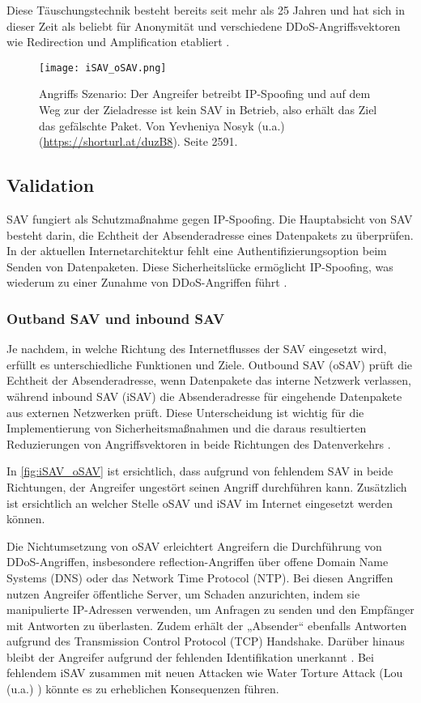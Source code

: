 \documentclass[sigplan,screen]{acmart}
\begin{document}
Diese Täuschungstechnik besteht bereits seit mehr als 25 Jahren und hat sich in dieser Zeit als beliebt für Anonymität und verschiedene DDoS-Angriffsvektoren wie Redirection und Amplification etabliert \cite{manrs01}.

\begin{figure}[h]
  \centering
  \texttt{[image: iSAV\_oSAV.png]}
  \caption{Angriffs Szenario:  Der Angreifer betreibt IP-Spoofing und auf dem Weg zur der Zieladresse ist kein SAV in Betrieb, also erhält das Ziel das gefälschte Paket. Von Yevheniya Nosyk (u.a.) (\url{https://shorturl.at/duzB8}). Seite 2591.}
  \label{fig:iSAV_oSAV}
\end{figure}

\subsection{Validation}

SAV fungiert als Schutzmaßnahme gegen IP-Spoofing. Die Hauptabsicht von SAV besteht darin, die Echtheit der Absenderadresse eines Datenpakets zu überprüfen. In der aktuellen Internetarchitektur fehlt eine Authentifizierungsoption beim Senden von Datenpaketen. Diese Sicherheitslücke ermöglicht IP-Spoofing, was wiederum zu einer Zunahme von DDoS-Angriffen führt \cite{Hal01}.

\subsubsection{Outband SAV und inbound SAV}

Je nachdem, in welche Richtung des Internetflusses der SAV eingesetzt wird, erfüllt es unterschiedliche Funktionen und Ziele. Outbound SAV (oSAV) prüft die Echtheit der Absenderadresse, wenn Datenpakete das interne Netzwerk verlassen, während inbound SAV (iSAV) die Absenderadresse für eingehende Datenpakete aus externen Netzwerken prüft. Diese Unterscheidung ist wichtig für die Implementierung von Sicherheitsmaßnahmen und die daraus resultierten Reduzierungen von Angriffsvektoren in beide Richtungen des Datenverkehrs \cite{Hal01}. 

In \autoref{fig:iSAV_oSAV} ist ersichtlich, dass aufgrund von fehlendem SAV in beide Richtungen, der Angreifer ungestört seinen Angriff durchführen kann. Zusätzlich ist ersichtlich an welcher Stelle oSAV und iSAV im Internet eingesetzt werden können.

Die Nichtumsetzung von oSAV erleichtert Angreifern die Durchführung von DDoS-Angriffen, insbesondere reflection-Angriffen über offene Domain Name Systems (DNS) oder das Network Time Protocol (NTP). Bei diesen Angriffen nutzen Angreifer öffentliche Server, um Schaden anzurichten, indem sie manipulierte IP-Adressen verwenden, um Anfragen zu senden und den Empfänger mit Antworten zu überlasten. Zudem erhält der „Absender“ ebenfalls Antworten aufgrund des Transmission Control Protocol (TCP) Handshake. Darüber hinaus bleibt der Angreifer aufgrund der fehlenden Identifikation unerkannt \cite{manrs01} \cite{Hal01} \cite{Ingress01}. Bei fehlendem iSAV zusammen mit neuen Attacken wie Water Torture Attack (Lou (u.a.) \cite{Lou01}) könnte es zu erheblichen Konsequenzen führen.
\end{document}
